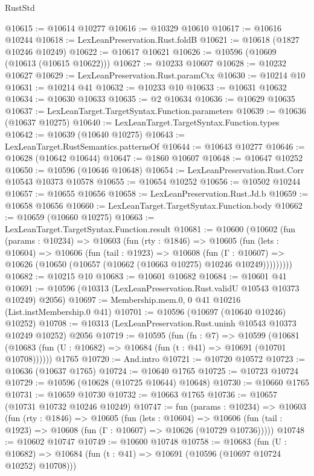 \begin{lexlean}{RustStd}
\begin{coremodule}
@10615 := @10614 @10277
@10616 := @10329 @10610
@10617 := @10616 @10244
@10618 := LexLeanPreservation.Rust.foldB
@10621 := @10618 (@1827 @10246 @10249)
@10622 := @10617 @10621
@10626 := @10596 (@10609 (@10613 (@10615 @10622)))
@10627 := @10233 @10607
@10628 := @10232 @10627
@10629 := LexLeanPreservation.Rust.paramCtx
@10630 := @10214 @10
@10631 := @10214 @41
@10632 := @10233 @10
@10633 := @10631 @10632
@10634 := @10630 @10633
@10635 := @2 @10634
@10636 := @10629 @10635
@10637 := LexLeanTarget.TargetSyntax.Function.parameters
@10639 := @10636 (@10637 @10275)
@10640 := LexLeanTarget.TargetSyntax.Function.types
@10642 := @10639 (@10640 @10275)
@10643 := LexLeanTarget.RustSemantics.patternsOf
@10644 := @10643 @10277
@10646 := @10628 (@10642 @10644)
@10647 := @1860 @10607
@10648 := @10647 @10252
@10650 := @10596 (@10646 @10648)
@10654 := LexLeanPreservation.Rust.Corr @10543 @10373 @10578
@10655 := @10654 @10252
@10656 := @10502 @10244
@10657 := @10655 @10656
@10658 := LexLeanPreservation.Rust.Jd.b
@10659 := @10658 @10656
@10660 := LexLeanTarget.TargetSyntax.Function.body
@10662 := @10659 (@10660 @10275)
@10663 := LexLeanTarget.TargetSyntax.Function.result
@10681 := @10600
    (@10602
      (fun (params : @10234) =>
      @10603
        (fun (rty : @1846) =>
        @10605
          (fun (lets : @10604) =>
          @10606
            (fun (tail : @1923) =>
            @10608
              (fun (Γ : @10607) =>
              @10626 (@10650 (@10657 (@10662 (@10663 @10275) @10246 @10249)))))))))
@10682 := @10215 @10
@10683 := @10601 @10682
@10684 := @10601 @41
@10691 := @10596 (@10313 (LexLeanPreservation.Rust.validU @10543 @10373 @10249) @2056)
@10697 := Membership.mem.{0, 0} @41 @10216 (List.instMembership.{0} @41)
@10701 := @10596 (@10697 (@10640 @10246) @10252)
@10708 := @10313 (LexLeanPreservation.Rust.uninh @10543 @10373 @10249 @10252) @2056
@10719 := @10595
    (fun (fn : @7) =>
    @10599 (@10681 (@10683 (fun (U : @10682) => @10684 (fun (t : @41) => @10691 (@10701 @10708))))))
    @1765
@10720 := And.intro
@10721 := @10720 @10572
@10723 := @10636 (@10637 @1765)
@10724 := @10640 @1765
@10725 := @10723 @10724
@10729 := @10596 (@10628 (@10725 @10644) @10648)
@10730 := @10660 @1765
@10731 := @10659 @10730
@10732 := @10663 @1765
@10736 := @10657 (@10731 @10732 @10246 @10249)
@10747 := fun (params : @10234) =>
  @10603
    (fun (rty : @1846) =>
    @10605
      (fun (lets : @10604) =>
      @10606 (fun (tail : @1923) => @10608 (fun (Γ : @10607) => @10626 (@10729 @10736)))))
@10748 := @10602 @10747
@10749 := @10600 @10748
@10758 := @10683
    (fun (U : @10682) => @10684 (fun (t : @41) => @10691 (@10596 (@10697 @10724 @10252) @10708)))

\end{coremodule}
\end{lexlean}
